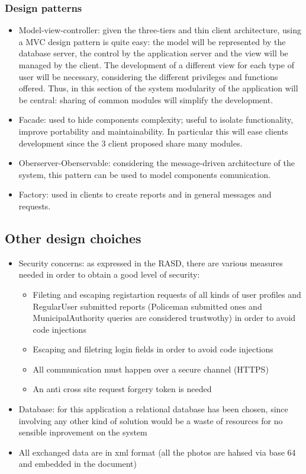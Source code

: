\subsubsection{Design patterns}
\begin{itemize}
	\item Model-view-controller: given the three-tiers and thin client architecture, using a MVC design pattern is quite easy: the model will be represented by the database server, the control by the application server and the view will be managed by the client. \newline
	The development of a different view for each type of user will be necessary, considering the different privileges and functions offered. Thus, in this section of the system modularity of the application will be central: sharing of common modules will simplify the development. 
	\item Facade: used to hide components complexity; useful to isolate functionality, improve portability and maintainability. In particular this will ease clients development since the 3 client proposed share many modules.
	\item Oberserver-Oberservable: considering the message-driven architecture of the system, this pattern can be used to model components comunication.
	\item Factory: used in clients to create reports and in general messages and requests.
\end{itemize}

\subsection{Other design choiches}
\begin{itemize}
	\item Security concerns: as expressed in the RASD, there are various measures needed in order to obtain a good level of security:
	\begin{itemize}
		\item Fileting and escaping registartion requests of all kinds of user profiles and RegularUser submitted reports (Policeman submitted ones and MunicipalAuthority queries are considered trustwothy) in order to avoid code injections
		\item Escaping and filetring login fields in order to avoid code injections
		\item All communication must happen over a secure channel (HTTPS)
		\item An anti cross site request forgery token is needed 
	\end{itemize}
	\item Database: for this application a relational database has been chosen, since involving any other kind of solution would be a waste of resources for no sensible inprovement on the system
	\item All exchanged data are in xml format (all the photos are hahsed via base 64 and embedded in the document)
\end{itemize}